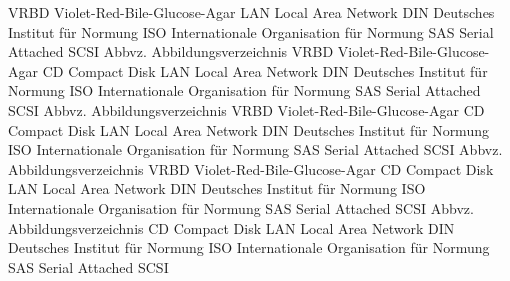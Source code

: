   {VRBD}   {Violet-Red-Bile-Glucose-Agar}
   {LAN}    {Local Area Network}
   {DIN}    {Deutsches Institut für Normung}
   {ISO}    {Internationale Organisation für Normung}
   {SAS}    {Serial Attached SCSI}
 {Abbvz.} {Abbildungsverzeichnis}
    {VRBD}   {Violet-Red-Bile-Glucose-Agar}
    {CD}     {Compact Disk}
    {LAN}    {Local Area Network}
    {DIN}    {Deutsches Institut für Normung}
    {ISO}    {Internationale Organisation für Normung}
    {SAS}    {Serial Attached SCSI}
    {Abbvz.} {Abbildungsverzeichnis}
    {VRBD}   {Violet-Red-Bile-Glucose-Agar}
    {CD}     {Compact Disk}
    {LAN}    {Local Area Network}
    {DIN}    {Deutsches Institut für Normung}
    {ISO}    {Internationale Organisation für Normung}
    {SAS}    {Serial Attached SCSI}
    {Abbvz.} {Abbildungsverzeichnis}
    {VRBD}   {Violet-Red-Bile-Glucose-Agar}
    {CD}     {Compact Disk}
    {LAN}    {Local Area Network}
    {DIN}    {Deutsches Institut für Normung}
    {ISO}    {Internationale Organisation für Normung}
    {SAS}    {Serial Attached SCSI}
    {Abbvz.} {Abbildungsverzeichnis}
    {CD}     {Compact Disk}
    {LAN}    {Local Area Network}
    {DIN}    {Deutsches Institut für Normung}
    {ISO}    {Internationale Organisation für Normung}
    {SAS}    {Serial Attached SCSI}

